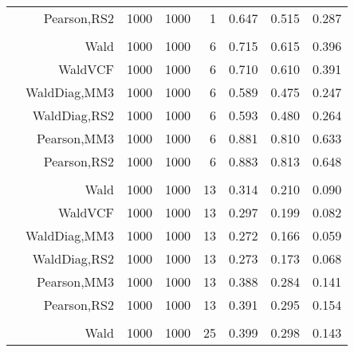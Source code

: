\documentclass[
]{article}
\begin{document}
\begin{table}[H]
{\begin{tabular}[t]{lrrrrrrr}
\hspace{1em} & Pearson,RS2 & 1000 & 1000 & 1 & 0.647 & 0.515 & 0.287\\
\cmidrule{1-8}
\addlinespace[0.3em]
\multicolumn{8}{l}{\textbf{1F 15V}}\\
\hspace{1em} & Wald & 1000 & 1000 & 6 & 0.715 & 0.615 & 0.396\\

\hspace{1em} & WaldVCF & 1000 & 1000 & 6 & 0.710 & 0.610 & 0.391\\

\hspace{1em} & WaldDiag,MM3 & 1000 & 1000 & 6 & 0.589 & 0.475 & 0.247\\

\hspace{1em} & WaldDiag,RS2 & 1000 & 1000 & 6 & 0.593 & 0.480 & 0.264\\

\hspace{1em} & Pearson,MM3 & 1000 & 1000 & 6 & 0.881 & 0.810 & 0.633\\

\hspace{1em} & Pearson,RS2 & 1000 & 1000 & 6 & 0.883 & 0.813 & 0.648\\
\cmidrule{1-8}
\addlinespace[0.3em]
\multicolumn{8}{l}{\textbf{2F 10V}}\\
\hspace{1em} & Wald & 1000 & 1000 & 13 & 0.314 & 0.210 & 0.090\\

\hspace{1em} & WaldVCF & 1000 & 1000 & 13 & 0.297 & 0.199 & 0.082\\

\hspace{1em} & WaldDiag,MM3 & 1000 & 1000 & 13 & 0.272 & 0.166 & 0.059\\

\hspace{1em} & WaldDiag,RS2 & 1000 & 1000 & 13 & 0.273 & 0.173 & 0.068\\

\hspace{1em} & Pearson,MM3 & 1000 & 1000 & 13 & 0.388 & 0.284 & 0.141\\

\hspace{1em} & Pearson,RS2 & 1000 & 1000 & 13 & 0.391 & 0.295 & 0.154\\
\cmidrule{1-8}
\addlinespace[0.3em]
\multicolumn{8}{l}{\textbf{3F 15V}}\\
\hspace{1em} & Wald & 1000 & 1000 & 25 & 0.399 & 0.298 & 0.143\\


\end{tabular}}
\end{table}
\end{document}
